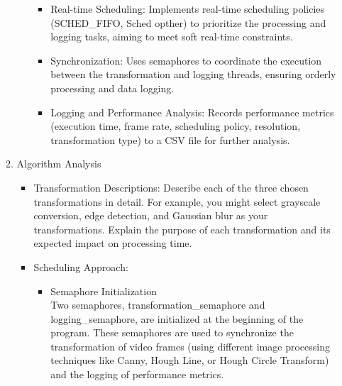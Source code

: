 \documentclass[a4paper,11pt]{article}%
\newenvironment{qanda}{\setlength{\parindent}{0pt}}{\bigskip}
\begin{document}
\begin{qanda}
\begin{enumerate}
\begin{enumerate}
\begin{itemize}
\begin{itemize}
						            \item Real-time Scheduling: Implements real-time scheduling policies (SCHED\_FIFO, Sched opther) to prioritize the processing and logging tasks, aiming to meet soft real-time constraints.
						            \item Synchronization: Uses semaphores to coordinate the execution between the transformation and logging threads, ensuring orderly processing and data logging.
						            \item Logging and Performance Analysis: Records performance metrics (execution time, frame rate, scheduling policy, resolution, transformation type) to a CSV file for further analysis.
					            \end{itemize}
				      \end{itemize}
				\item Algorithm Analysis
				      \begin{itemize}
					      \item Transformation Descriptions: Describe each of the three chosen transformations in detail. For example, you might select grayscale conversion, edge detection, and Gaussian blur as your transformations. Explain the purpose of each transformation and its expected impact on processing time.
					      
					      \item Scheduling Approach:
					            \begin{itemize}
						            \item Semaphore Initialization\\
						                  Two semaphores, transformation\_semaphore and logging\_semaphore, are initialized at the beginning of the program. These semaphores are used to synchronize the transformation of video frames (using different image processing techniques like Canny, Hough Line, or Hough Circle Transform) and the logging of performance metrics.


\end{itemize}
\end{itemize}
\end{enumerate}
\end{enumerate}
\end{qanda}
\end{document}
